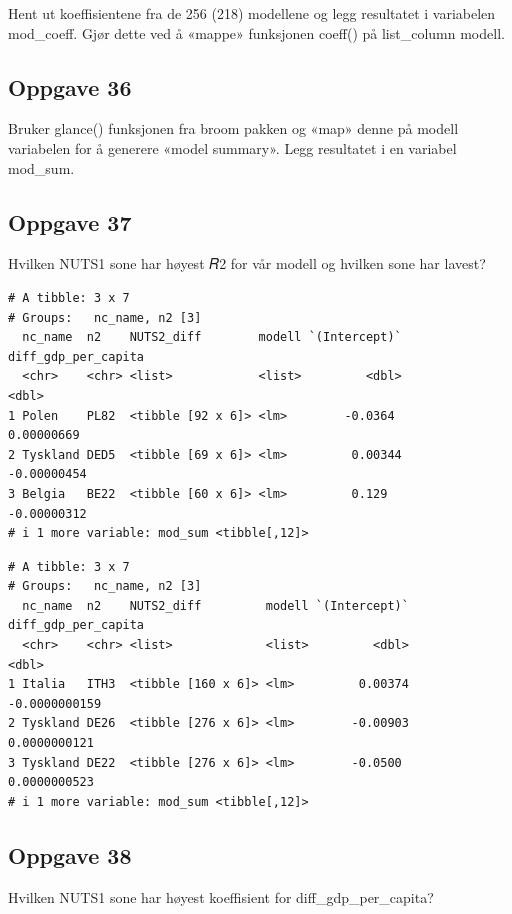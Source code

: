 \documentclass[
  a4paper,
]{article}
\begin{document}
Hent ut koeffisientene fra de 256 (218) modellene og legg resultatet i
variabelen mod\_coeff. Gjør dette ved å «mappe» funksjonen coeff() på
list\_column modell.

\subsection{Oppgave 36}\label{oppgave-36}

Bruker glance() funksjonen fra broom pakken og «map» denne på modell
variabelen for å generere «model summary». Legg resultatet i en variabel
mod\_sum.

\subsection{Oppgave 37}\label{oppgave-37}

Hvilken NUTS1 sone har høyest 𝑅2 for vår modell og hvilken sone har
lavest?

\begin{verbatim}
# A tibble: 3 x 7
# Groups:   nc_name, n2 [3]
  nc_name  n2    NUTS2_diff        modell `(Intercept)` diff_gdp_per_capita
  <chr>    <chr> <list>            <list>         <dbl>               <dbl>
1 Polen    PL82  <tibble [92 x 6]> <lm>        -0.0364           0.00000669
2 Tyskland DED5  <tibble [69 x 6]> <lm>         0.00344         -0.00000454
3 Belgia   BE22  <tibble [60 x 6]> <lm>         0.129           -0.00000312
# i 1 more variable: mod_sum <tibble[,12]>
\end{verbatim}

\begin{verbatim}
# A tibble: 3 x 7
# Groups:   nc_name, n2 [3]
  nc_name  n2    NUTS2_diff         modell `(Intercept)` diff_gdp_per_capita
  <chr>    <chr> <list>             <list>         <dbl>               <dbl>
1 Italia   ITH3  <tibble [160 x 6]> <lm>         0.00374       -0.0000000159
2 Tyskland DE26  <tibble [276 x 6]> <lm>        -0.00903        0.0000000121
3 Tyskland DE22  <tibble [276 x 6]> <lm>        -0.0500         0.0000000523
# i 1 more variable: mod_sum <tibble[,12]>
\end{verbatim}

\subsection{Oppgave 38}\label{oppgave-38}

Hvilken NUTS1 sone har høyest koeffisient for diff\_gdp\_per\_capita?
\end{document}
